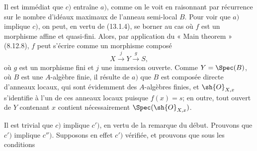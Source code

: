 Il est immédiat que $c)$ entraîne $a)$, comme on le voit en raisonnant par récurrence sur le nombre d'idéaux maximaux de l'anneau semi-local $B$. Pour voir que $a)$ implique $c)$, on peut, en vertu de (13.1.4), se borner au cas où $f$ est un morphisme affine et quasi-fini. Alors, par application du « Main theorem » (8.12.8), $f$ peut s'écrire comme un morphisme composé
\[
  X\xrightarrow{j}Y\xrightarrow{g}S,
\]
où $g$ est un morphisme fini et $j$ une immersion ouverte. Comme $Y=\Spec(B)$, où $B$ est une $A$-algèbre finie, il résulte de $a)$ que $B$ est composée directe d'anneaux locaux, qui sont évidemment des $A$-algèbres finies, et $\sh{O}_{X,x}$ s'identifie à l'un de ces anneaux locaux puisque $f(x)=s$; en outre, tout ouvert de $Y$ contenant $x$ contient nécessairement $\Spec(\sh{O}_{X,x})$.

Il est trivial que $c)$ implique $c')$, en vertu de la remarque du début. Prouvons que $c')$ implique $c'')$. Supposons en effet $c')$ vérifiée, et prouvons que sous les conditions

